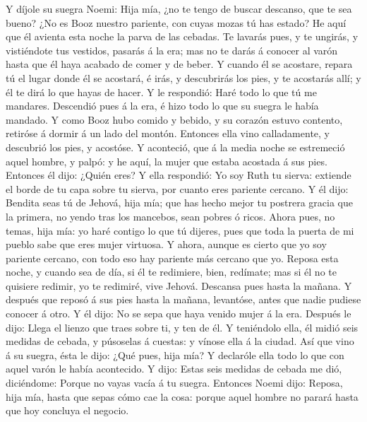  Y díjole su suegra Noemi: Hija mía, ¿no te tengo de
buscar descanso, que te sea bueno?  ¿No es Booz nuestro
pariente, con cuyas mozas tú has estado? He aquí que él avienta esta
noche la parva de las cebadas.  Te lavarás pues, y te
ungirás, y vistiéndote tus vestidos, pasarás á la era; mas no te darás á
conocer al varón hasta que él haya acabado de comer y de beber.
 Y cuando él se acostare, repara tú el lugar donde él se
acostará, é irás, y descubrirás los pies, y te acostarás allí; y él te
dirá lo que hayas de hacer.  Y le respondió: Haré todo lo
que tú me mandares.  Descendió pues á la era, é hizo todo
lo que su suegra le había mandado.  Y como Booz hubo
comido y bebido, y su corazón estuvo contento, retiróse á dormir á un
lado del montón. Entonces ella vino calladamente, y descubrió los pies,
y acostóse.  Y aconteció, que á la media noche se
estremeció aquel hombre, y palpó: y he aquí, la mujer que estaba
acostada á sus pies.  Entonces él dijo: ¿Quién eres? Y
ella respondió: Yo soy Ruth tu sierva: extiende el borde de tu capa
sobre tu sierva, por cuanto eres pariente cercano.  Y él
dijo: Bendita seas tú de Jehová, hija mía; que has hecho mejor tu
postrera gracia que la primera, no yendo tras los mancebos, sean pobres
ó ricos.  Ahora pues, no temas, hija mía: yo haré contigo
lo que tú dijeres, pues que toda la puerta de mi pueblo sabe que eres
mujer virtuosa.  Y ahora, aunque es cierto que yo soy
pariente cercano, con todo eso hay pariente más cercano que yo.
 Reposa esta noche, y cuando sea de día, si él te
redimiere, bien, redímate; mas si él no te quisiere redimir, yo te
redimiré, vive Jehová. Descansa pues hasta la mañana.  Y
después que reposó á sus pies hasta la mañana, levantóse, antes que
nadie pudiese conocer á otro. Y él dijo: No se sepa que haya venido
mujer á la era.  Después le dijo: Llega el lienzo que
traes sobre ti, y ten de él. Y teniéndolo ella, él midió seis medidas de
cebada, y púsoselas á cuestas: y vínose ella á la ciudad.
 Así que vino á su suegra, ésta le dijo: ¿Qué pues, hija
mía? Y declaróle ella todo lo que con aquel varón le había acontecido.
 Y dijo: Estas seis medidas de cebada me dió, diciéndome:
Porque no vayas vacía á tu suegra.  Entonces Noemi dijo:
Reposa, hija mía, hasta que sepas cómo cae la cosa: porque aquel hombre
no parará hasta que hoy concluya el negocio.

